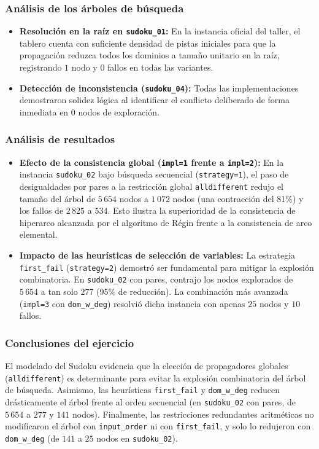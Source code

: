 \subsubsection{Análisis de los árboles de búsqueda}
\begin{itemize}
    \item \textbf{Resolución en la raíz en \texttt{sudoku\_01}:} En la instancia oficial del taller, el tablero cuenta con suficiente densidad de pistas iniciales para que la propagación reduzca todos los dominios a tamaño unitario en la raíz, registrando $1$ nodo y $0$ fallos en todas las variantes.
    \item \textbf{Detección de inconsistencia (\texttt{sudoku\_04}):} Todas las implementaciones demostraron solidez lógica al identificar el conflicto deliberado de forma inmediata en $0$ nodos de exploración.
\end{itemize}

\subsubsection{Análisis de resultados}
\begin{itemize}
    \item \textbf{Efecto de la consistencia global (\texttt{impl=1} frente a \texttt{impl=2}):} En la instancia \texttt{sudoku\_02} bajo búsqueda secuencial (\texttt{strategy=1}), el paso de desigualdades por pares a la restricción global \texttt{alldifferent} redujo el tamaño del árbol de $5\,654$ nodos a $1\,072$ nodos (una contracción del 81\%) y los fallos de $2\,825$ a $534$. Esto ilustra la superioridad de la consistencia de hiperarco alcanzada por el algoritmo de Régin frente a la consistencia de arco elemental.
    \item \textbf{Impacto de las heurísticas de selección de variables:} La estrategia \texttt{first\_fail} (\texttt{strategy=2}) demostró ser fundamental para mitigar la explosión combinatoria. En \texttt{sudoku\_02} con pares, contrajo los nodos explorados de $5\,654$ a tan solo $277$ (95\% de reducción). La combinación más avanzada (\texttt{impl=3} con \texttt{dom\_w\_deg}) resolvió dicha instancia con apenas $25$ nodos y $10$ fallos.
\end{itemize}

\subsubsection{Conclusiones del ejercicio}
El modelado del Sudoku evidencia que la elección de propagadores globales (\texttt{alldifferent}) es determinante para evitar la explosión combinatoria del árbol de búsqueda. Asimismo, las heurísticas \texttt{first\_fail} y \texttt{dom\_w\_deg} reducen drásticamente el árbol frente al orden secuencial (en \texttt{sudoku\_02} con pares, de $5\,654$ a $277$ y $141$ nodos). Finalmente, las restricciones redundantes aritméticas no modificaron el árbol con \texttt{input\_order} ni con \texttt{first\_fail}, y solo lo redujeron con \texttt{dom\_w\_deg} (de $141$ a $25$ nodos en \texttt{sudoku\_02}).
